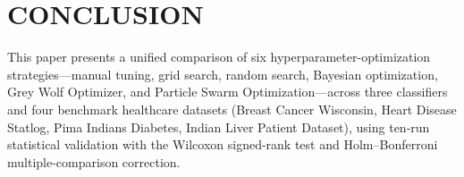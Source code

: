 \documentclass[letterpaper, 10 pt, conference]{ieeeconf}
\begin{document}
\section{CONCLUSION}
\label{sec:conclusion}

This paper presents a unified comparison of six hyperparameter-optimization strategies---manual tuning, grid search, random search, Bayesian optimization, Grey Wolf Optimizer, and Particle Swarm Optimization---across three classifiers and four benchmark healthcare datasets (Breast Cancer Wisconsin, Heart Disease Statlog, Pima Indians Diabetes, Indian Liver Patient Dataset), using ten-run statistical validation with the Wilcoxon signed-rank test and Holm--Bonferroni multiple-comparison correction.
\end{document}
